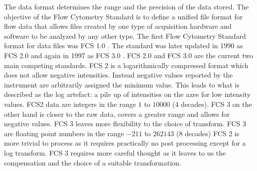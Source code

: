 The data format determines the range and the precision of the data stored.
The objective of the Flow Cytometry Standard is to define a unified file format for flow data
that allows files created by one type of acquisition hardware and software to be analyzed by any other type.
The first Flow Cytometry Standard format for data files was FCS 1.0 \citep{Murphy:1984ev}.
The standard was later updated in 1990 as FCS 2.0 \citep{Anon:1990ce} and again in 1997 as FCS 3.0 \citep{Anonymous:vr}.
FCS 2.0 and FCS 3.0 are the current two main competing standards.
FCS 2 is a logarithmically compressed format which does not allow negative intensities.  
Instead negative values reported by the instrument are arbitrarily assigned the minimum value.
This leads to what is described as the log artefact: a pile up of intensities on the axes for low intensity values.
FCS2 data are integers in the range $1$ to $10000$ (4 decades).
FCS 3 on the other hand is closer to the raw data, covers a greater range and allows for negative values.
FCS 3 leaves more flexibility to the choice of transform.
FCS 3 are floating point numbers in the range $-211$ to $262143$ (8 decades)
FCS 2 is more trivial to process as it requires practically no post processing except for a log transform.
FCS 3 requires more careful thought as it leaves to us the compensation and the choice of a suitable transformation.


